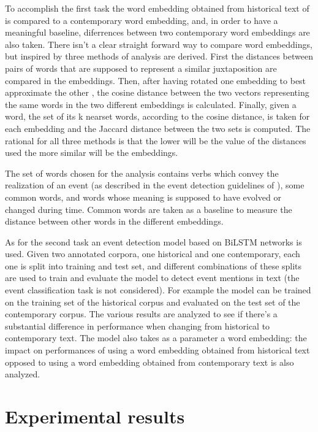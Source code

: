 \documentclass[runningheads]{llncs}
\begin{document}
To accomplish the first task the word embedding obtained from historical text of \cite{histo} is compared to a contemporary word embedding, and, in order to have a meaningful baseline, diferrences between two contemporary word embeddings are also taken. There isn't a clear straight forward way to compare word embeddings, but inspired by \cite{embcomp} three methods of analysis are derived. First the distances between pairs of words that are supposed to represent a similar juxtaposition are compared in the embeddings. Then, after having rotated one embedding to best approximate the other \cite{rotation}, the cosine distance between the two vectors representing the same words in the two different embeddings is calculated. Finally, given a word, the set of its k nearset words, according to the cosine distance, is taken for each embedding and the Jaccard distance between the two sets is computed. The rational for all three methods is that the lower will be the value of the distances used the more similar will be the embeddings.

The set of words chosen for the analysis contains verbs which convey the realization of an event (as described in the event detection guidelines of \cite{histo}), some common words, and words whose meaning is supposed to have evolved or changed during time. Common words are taken as a baseline to measure the distance between other words in the different embeddings.

As for the second task an event detection model based on BiLSTM networks \cite{bilstm} is used. Given two annotated corpora, one historical and one contemporary, each one is split into training and test set, and different combinations of these splits are used to train and evaluate the model to detect event mentions in text (the event classification task is not considered). For example the model can be trained on the training set of the historical corpus and evaluated on the test set of the contemporary corpus. The various results are analyzed to see if there's a substantial difference in performance when changing from historical to contemporary text. The model also takes as a parameter a word embedding: the impact on performances of using a word embedding obtained from historical text opposed to using a word embedding obtained from contemporary text is also analyzed.

\section{Experimental results}
\end{document}
